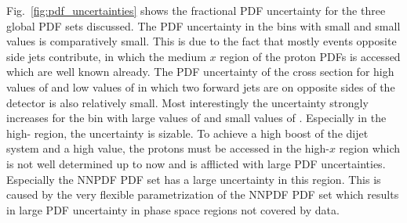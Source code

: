 Fig.~\ref{fig:pdf_uncertainties} shows the fractional PDF uncertainty for the
three global PDF sets discussed. The PDF uncertainty in the bins with small
\ystar and small \yboost values is comparatively small. This is due to the fact
that mostly events opposite side jets contribute, in which the medium $x$ region
of the proton PDFs is accessed which are well known already. The PDF uncertainty
of the cross section for high values of \ystar and low values of \yboost in
which two forward jets are on opposite sides of the detector is also relatively
small. Most interestingly the uncertainty strongly increases for the bin with
large values of \yboost and small values of \ystar.  Especially in the high-\pt
region, the uncertainty is sizable. To achieve a high boost of the dijet system
and a high \ptavg value, the protons must be accessed in the high-$x$ region
which is not well determined up to now and is afflicted with large PDF
uncertainties. Especially the NNPDF PDF set has a large uncertainty in this
region. This is caused by the very flexible parametrization of the NNPDF PDF set
which results in large PDF uncertainty in phase space regions not covered by
data.

